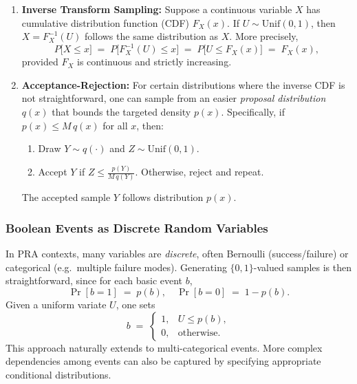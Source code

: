 \begin{enumerate}
\item \textbf{Inverse Transform Sampling:}  
   Suppose a continuous variable \(X\) has cumulative distribution function (CDF) \(F_X(x)\). If \(U\sim \mathrm{Unif}(0,1)\), then \(X=F_X^{-1}(U)\) follows the same distribution as \(X\). More precisely,
   \[
   P\bigl[X \le x\bigr]
   \;=\;
   P\bigl[F_X^{-1}(U)\le x\bigr]
   \;=\;
   P\bigl[U \le F_X(x)\bigr]
   \;=\;
   F_X(x),
   \]
   provided \(F_X\) is continuous and strictly increasing.  

\item \textbf{Acceptance-Rejection:}  
   For certain distributions where the inverse CDF is not straightforward, one can sample from an easier \emph{proposal distribution} \(q(x)\) that bounds the targeted density \(p(x)\). Specifically, if \(p(x)\le M\,q(x)\) for all \(x\), then:
   \begin{enumerate}
   \item Draw \(Y\sim q(\cdot)\) and \(Z\sim \mathrm{Unif}(0,1)\).
   \item Accept \(Y\) if \(Z\le \frac{p(Y)}{M\,q(Y)}\). Otherwise, reject and repeat.
   \end{enumerate}
   The accepted sample \(Y\) follows distribution \(p(x)\).  
\end{enumerate}

\subsubsection{Boolean Events as Discrete Random Variables}
In PRA contexts, many variables are \emph{discrete}, often Bernoulli (success/failure) or categorical (e.g.\ multiple failure modes). Generating \(\{0,1\}\)-valued samples is then straightforward, since for each basic event \(b\),
\[
\Pr[b=1] \;=\; p(b),
\quad
\Pr[b=0] \;=\; 1-p(b).
\]
Given a uniform variate \(U\), one sets
\[
b
\;=\;
\begin{cases}
1, & U \le p(b),\\
0, & \text{otherwise}.
\end{cases}
\]
This approach naturally extends to multi-categorical events. More complex dependencies among events can also be captured by specifying appropriate conditional distributions.

